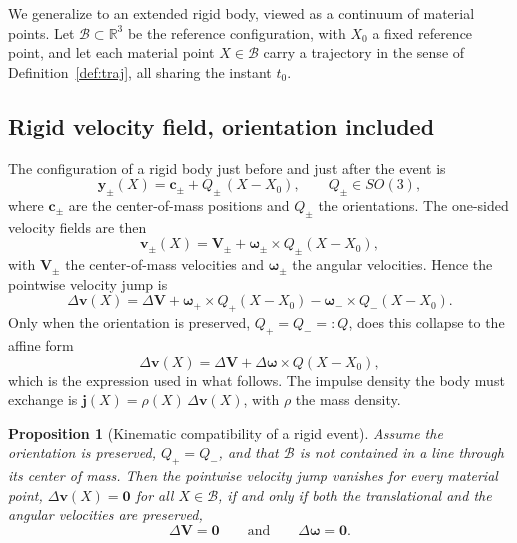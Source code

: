 \documentclass[11pt]{article}
\newtheorem{proposition}[definition]{Proposition}
\begin{document}
	We generalize to an extended rigid body, viewed as a continuum of
	material points. Let $\mathcal B\subset\mathbb R^3$ be the reference
	configuration, with $X_0$ a fixed reference point, and let each material
	point $X\in\mathcal B$ carry a trajectory in the sense of
	Definition~\ref{def:traj}, all sharing the instant $t_0$.
	
	\subsection{Rigid velocity field, orientation included}
	
	The configuration of a rigid body just before and just after the event
	is
	\begin{equation}
		\mathbf y_{\pm}(X)=\mathbf c_{\pm}+Q_{\pm}\,(X-X_0),
		\qquad Q_{\pm}\in SO(3),
		\label{eq:rigidconfig}
	\end{equation}
	where $\mathbf c_{\pm}$ are the center-of-mass positions and $Q_{\pm}$
	the orientations. The one-sided velocity fields are then
	\begin{equation}
		\mathbf v_{\pm}(X)=\mathbf V_{\pm}
		+\boldsymbol\omega_{\pm}\times Q_{\pm}(X-X_0),
		\label{eq:rigidvel}
	\end{equation}
	with $\mathbf V_{\pm}$ the center-of-mass velocities and
	$\boldsymbol\omega_{\pm}$ the angular velocities. Hence the pointwise
	velocity jump is
	\begin{equation}
		\Delta\mathbf v(X)=\Delta\mathbf V
		+\boldsymbol\omega_{+}\times Q_{+}(X-X_0)
		-\boldsymbol\omega_{-}\times Q_{-}(X-X_0).
		\label{eq:rigidjumpfull}
	\end{equation}
	Only when the orientation is preserved, $Q_{+}=Q_{-}=:Q$, does this
	collapse to the affine form
	\begin{equation}
		\Delta\mathbf v(X)=\Delta\mathbf V
		+\Delta\boldsymbol\omega\times Q(X-X_0),
		\label{eq:rigidjump}
	\end{equation}
	which is the expression used in what follows. The impulse density the
	body must exchange is $\mathbf j(X)=\rho(X)\,\Delta\mathbf v(X)$, with
	$\rho$ the mass density.
	
	\begin{proposition}[Kinematic compatibility of a rigid event]
		\label{prop:rigid}
		Assume the orientation is preserved, $Q_{+}=Q_{-}$, and that
		$\mathcal B$ is not contained in a line through its center of mass.
		Then the pointwise velocity jump vanishes for every material point,
		$\Delta\mathbf v(X)=\mathbf 0$ for all $X\in\mathcal B$, if and only
		if both the translational and the angular velocities are preserved,
		\[
		\Delta\mathbf V=\mathbf 0
		\qquad\text{and}\qquad
		\Delta\boldsymbol\omega=\mathbf 0.
		\]
	\end{proposition}
	
\end{document}
